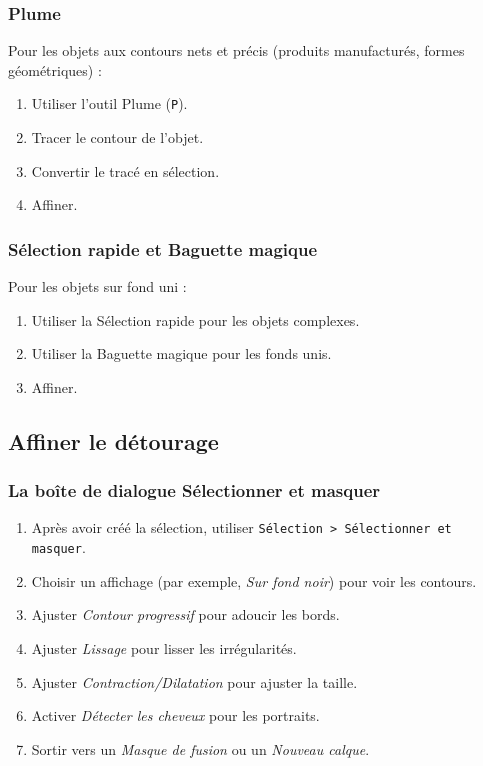\subsubsection{Plume}

Pour les objets aux contours nets et précis (produits manufacturés, formes géométriques) :

\begin{enumerate}
    \item Utiliser l'outil Plume (\texttt{P}).
    \item Tracer le contour de l'objet.
    \item Convertir le tracé en sélection.
    \item Affiner.
\end{enumerate}

\subsubsection{Sélection rapide et Baguette magique}

Pour les objets sur fond uni :

\begin{enumerate}
    \item Utiliser la Sélection rapide pour les objets complexes.
    \item Utiliser la Baguette magique pour les fonds unis.
    \item Affiner.
\end{enumerate}

\subsection{Affiner le détourage}

\subsubsection{La boîte de dialogue Sélectionner et masquer}

\begin{enumerate}
    \item Après avoir créé la sélection, utiliser \texttt{Sélection > Sélectionner et masquer}.
    \item Choisir un affichage (par exemple, \emph{Sur fond noir}) pour voir les contours.
    \item Ajuster \emph{Contour progressif} pour adoucir les bords.
    \item Ajuster \emph{Lissage} pour lisser les irrégularités.
    \item Ajuster \emph{Contraction/Dilatation} pour ajuster la taille.
    \item Activer \emph{Détecter les cheveux} pour les portraits.
    \item Sortir vers un \emph{Masque de fusion} ou un \emph{Nouveau calque}.
\end{enumerate}

